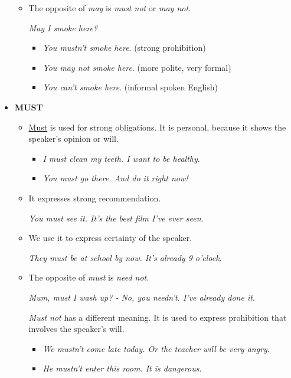 \begin{itemize}
\begin{itemize}
\item The opposite of \textit{may} is \textit{must not} or \textit{may not}.

\textit{May I smoke here?}
\begin{itemize}
\item \textit{You mustn't smoke here}. (strong prohibition) 
\item \textit{You may not smoke here}. (more polite, very formal) 
\item \textit{You can't smoke here}. (informal spoken English) 
\end{itemize}

\end{itemize}

\item\textbf{MUST}

\begin{itemize}

\item \underline{Must} is used for strong obligations. It is personal, because it shows the speaker's opinion or will.

\begin{itemize} 
\item \textit{I must clean my teeth. I want to be healthy}.
\item \textit{You must go there. And do it right now!}
\end{itemize}

\item It expresses strong recommendation. 

\textit{You must see it. It's the best film I've ever seen}.

\item We use it to express certainty of the speaker. 

\textit{They must be at school by now. It's already 9 o'clock}.

\item The opposite of \textit{must} is \textit{need not}. 

\textit{Mum, must I wash up? - No, you needn't. I've already done it}.

\textit{Must not} has a different meaning. It is used to express prohibition that involves the speaker's will.

\begin{itemize}
\item \textit{We mustn't come late today. Or the teacher will be very angry}.
\item \textit{He mustn't enter this room. It is dangerous}.
\end{itemize}

\end{itemize}

\end{itemize}

